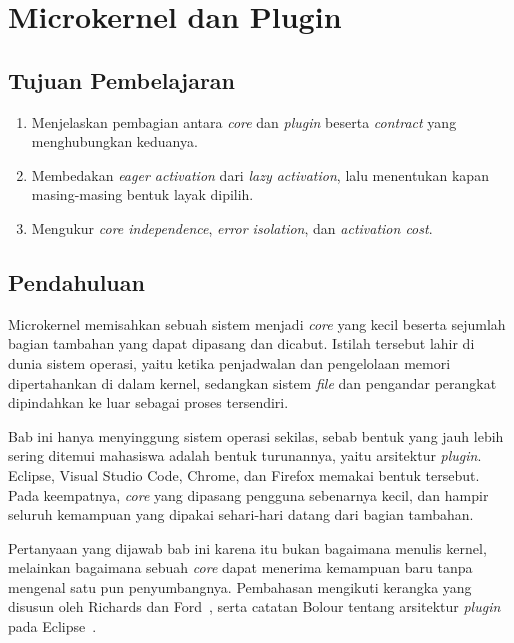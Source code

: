 \chapter{Microkernel dan Plugin}
\label{bab:plugin}

\section*{Tujuan Pembelajaran}

\begin{enumerate}
  \item Menjelaskan pembagian antara \textit{core} dan \textit{plugin} beserta \textit{contract}
    yang menghubungkan keduanya.
  \item Membedakan \textit{eager activation} dari \textit{lazy activation}, lalu menentukan kapan
    masing-masing bentuk layak dipilih.
  \item Mengukur \textit{core independence}, \textit{error isolation}, dan
    \textit{activation cost}.
\end{enumerate}

\section{Pendahuluan}

Microkernel memisahkan sebuah sistem menjadi
\textit{core} yang kecil beserta sejumlah
bagian tambahan yang dapat dipasang dan dicabut. Istilah tersebut lahir di
dunia sistem operasi, yaitu ketika penjadwalan dan pengelolaan memori
dipertahankan di dalam kernel, sedangkan sistem \textit{file} dan pengandar perangkat
dipindahkan ke luar sebagai proses tersendiri.

Bab ini hanya menyinggung sistem operasi sekilas, sebab bentuk yang jauh lebih
sering ditemui mahasiswa adalah bentuk turunannya, yaitu arsitektur
\textit{plugin}. Eclipse, Visual Studio Code, Chrome, dan
Firefox memakai bentuk
tersebut. Pada keempatnya, \textit{core} yang dipasang pengguna sebenarnya kecil, dan
hampir seluruh kemampuan yang dipakai sehari-hari datang dari bagian tambahan.

Pertanyaan yang dijawab bab ini karena itu bukan bagaimana menulis kernel,
melainkan bagaimana sebuah \textit{core} dapat menerima kemampuan baru tanpa mengenal
satu pun penyumbangnya. Pembahasan mengikuti kerangka yang disusun oleh Richards
dan Ford~\cite{richards2020fundamentals}, serta catatan Bolour tentang
arsitektur \textit{plugin} pada Eclipse~\cite{bolour2003eclipse}.

